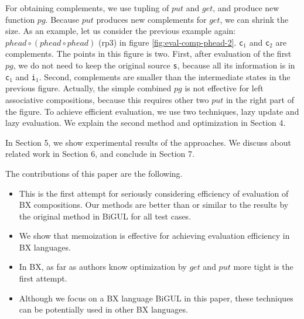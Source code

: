 For obtaining complements, we use tupling of $put$ and $get$, and produce new function $pg$. Because $put$ produces new complements for $get$, we can shrink the size.
As an example, let us consider the previous example again: $phead \circ (phead \circ phead)$ (rp3) in figure \ref{fig:eval-comp-phead-2}. \texttt{c$_1$} and \texttt{c$_2$} are complements. The points in this figure is two. First, after evaluation of the first $pg$, we do not need to keep the original source \texttt{s}, because all its information is in \texttt{c$_1$} and \texttt{i$_1$}. Second, complements are smaller than the intermediate states in the previous figure.
Actually, the simple combined $pg$ is not effective for left associative compositions, because this requires other two $put$ in the right part of the figure. To achieve efficient evaluation, we use two techniques, lazy update and lazy evaluation. We explain the second method and optimization in Section 4.

In Section 5, we show experimental results of the approaches. We discuss about related work in Section 6, and conclude in Section 7.


The contributions of this paper are the following.

\begin{itemize}
\item This is the first attempt for seriously considering efficiency of evaluation of BX compositions. Our methods are better than or similar to the results by the original method in BiGUL for all test cases.
\item We show that memoization is effective for achieving evaluation efficiency in BX languages.
\item In BX, as far as authors know optimization by $get$ and $put$ more tight is the first attempt. 
\item Although we focus on a BX language BiGUL in this paper, these techniques can be potentially used in other BX languages. 
\end{itemize}


